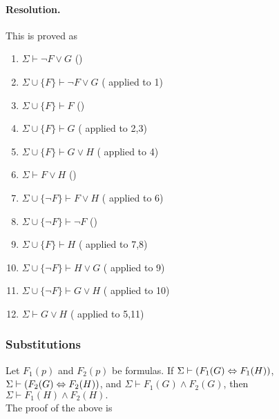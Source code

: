 \paragraph{Resolution.} %
\begin{prooftree}
\end{prooftree}
This is proved as
\begin{enumerate}
	\item $\Sigma\vdash \neg F\lor G$ \hfill ()
	\item $\Sigma\cup\{F\}\vdash \neg F\lor G$ \hfill ( applied to 1)
	\item $\Sigma\cup\{F\}\vdash F$ \hfill ()
	\item $\Sigma\cup\{F\}\vdash G$ \hfill ( applied to 2,3)
	\item $\Sigma\cup\{F\}\vdash G\lor H$ \hfill ( applied to 4)
	\item $\Sigma\vdash F\lor H$ \hfill ()
	\item $\Sigma\cup\{\neg F\}\vdash F\lor H$ \hfill ( applied to 6)
	\item $\Sigma\cup\{\neg F\}\vdash \neg F$ \hfill ()
	\item $\Sigma\cup\{F\}\vdash H$ \hfill ( applied to 7,8)
	\item $\Sigma\cup\{\neg F\}\vdash H\lor G$ \hfill ( applied to 9)
	\item $\Sigma\cup\{\neg F\}\vdash G\lor H$ \hfill ( applied to 10)
	\item $\Sigma\vdash G\lor H$ \hfill ( applied to 5,11)
\end{enumerate}

\subsubsection{Substitutions}

 Let $F_1(p)$ and $F_2(p)$ be formulas. If $\Sigma\vdash (F_1(G)\siff F_1(H))$, $\Sigma\vdash(F_2(G)\siff F_2(H))$, and $\Sigma\vdash F_1(G)\land F_2(G)$, then $\Sigma\vdash F_1(H)\land F_2(H).$\\
 The proof of the above is

